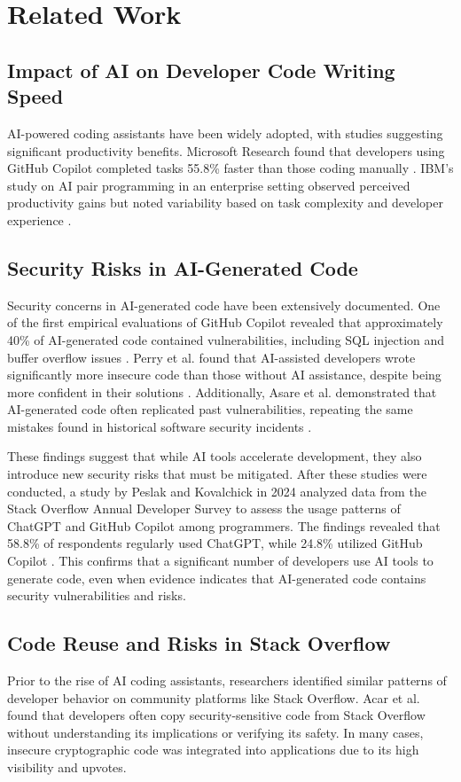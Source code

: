 \section{Related Work}

\subsection{Impact of AI on Developer Code Writing Speed}
AI-powered coding assistants have been widely adopted, with studies suggesting significant productivity benefits. Microsoft Research found that developers using GitHub Copilot completed tasks 55.8\% faster than those coding manually \cite{peng2023impact}. IBM’s study on AI pair programming in an enterprise setting observed perceived productivity gains but noted variability based on task complexity and developer experience \cite{weisz2025examining}.

\subsection{Security Risks in AI-Generated Code}
Security concerns in AI-generated code have been extensively documented. One of the first empirical evaluations of GitHub Copilot revealed that approximately 40\% of AI-generated code contained vulnerabilities, including SQL injection and buffer overflow issues \cite{fu2025security}. Perry et al. found that AI-assisted developers wrote significantly more insecure code than those without AI assistance, despite being more confident in their solutions \cite{perry2023}. Additionally, Asare et al. demonstrated that AI-generated code often replicated past vulnerabilities, repeating the same mistakes found in historical software security incidents \cite{asare2024}. 

These findings suggest that while AI tools accelerate development, they also introduce new security risks that must be mitigated. After these studies were conducted, a study by Peslak and Kovalchick in 2024 analyzed data from the Stack Overflow Annual Developer Survey to assess the usage patterns of ChatGPT and GitHub Copilot among programmers. The findings revealed that 58.8\% of respondents regularly used ChatGPT, while 24.8\% utilized GitHub Copilot \cite{peslak2024ai}. This confirms that a significant number of developers use AI tools to generate code, even when evidence indicates that AI-generated code contains security vulnerabilities and risks.

\subsection{Code Reuse and Risks in Stack Overflow}
Prior to the rise of AI coding assistants, researchers identified similar patterns of developer behavior on community platforms like Stack Overflow. Acar et al. \cite{acar2016stackoverflow} found that developers often copy security-sensitive code from Stack Overflow without understanding its implications or verifying its safety. In many cases, insecure cryptographic code was integrated into applications due to its high visibility and upvotes.

